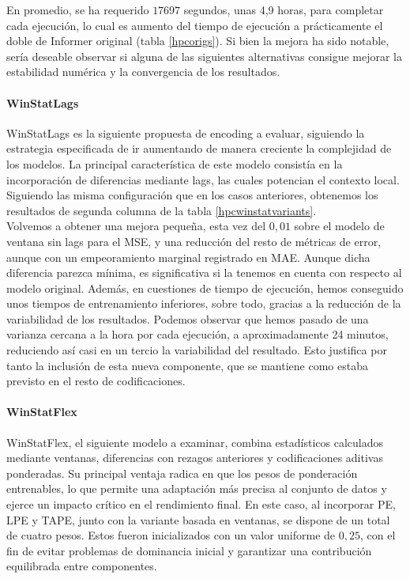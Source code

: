 En promedio, se ha requerido $17697$ segundos, unas 4,9 horas, para completar cada ejecución, lo cual es aumento del tiempo de ejecución a prácticamente el doble de Informer original (tabla \ref{hpcorigs}). Si bien la mejora ha sido notable, sería deseable observar si alguna de las siguientes alternativas consigue mejorar la estabilidad numérica y la convergencia de los resultados.

\paragraph{WinStatLags}

WinStatLags es la siguiente propuesta de encoding a evaluar, siguiendo la estrategia especificada de ir aumentando de manera creciente la complejidad de los modelos. La principal característica de este modelo consistía en la incorporación de diferencias mediante lags, las cuales potencian el contexto local. Siguiendo las misma configuración que en los casos anteriores, obtenemos los resultados de segunda columna de la tabla \ref{hpcwinstatvariants}.\\

Volvemos a obtener una mejora pequeña, esta vez del $0,01$ sobre el modelo de ventana sin lags para el MSE, y una reducción del resto de métricas de error, aunque con un empeoramiento marginal registrado en MAE. Aunque dicha diferencia parezca mínima, es significativa si la tenemos en cuenta con respecto al modelo original. Además, en cuestiones de tiempo de ejecución, hemos conseguido unos tiempos de entrenamiento inferiores, sobre todo, gracias a la reducción de la variabilidad de los resultados. Podemos observar que hemos pasado de una varianza cercana a la hora por cada ejecución, a aproximadamente 24 minutos, reduciendo así casi en un tercio la variabilidad del resultado. Esto justifica por tanto la inclusión de esta nueva componente, que se mantiene como estaba previsto en el resto de codificaciones.

\paragraph{WinStatFlex}

WinStatFlex, el siguiente modelo a examinar, combina estadísticos calculados mediante ventanas, diferencias con rezagos anteriores y codificaciones aditivas ponderadas. Su principal ventaja radica en que los pesos de ponderación entrenables, lo que permite una adaptación más precisa al conjunto de datos y ejerce un impacto crítico en el rendimiento final. En este caso, al incorporar PE, LPE y TAPE, junto con la variante basada en ventanas, se dispone de un total de cuatro pesos. Estos fueron inicializados con un valor uniforme de $0,25$, con el fin de evitar problemas de dominancia inicial y garantizar una contribución equilibrada entre componentes.\\

